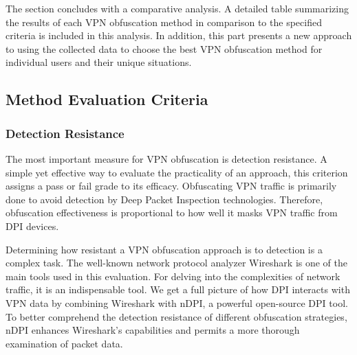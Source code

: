 \documentclass[12pt, fleqn, a4paper]{article}
\begin{document}
The section concludes with a comparative analysis. A detailed table summarizing the results of each VPN obfuscation method in comparison to the specified criteria is included in this analysis. In addition, this part presents a new approach to using the collected data to choose the best VPN obfuscation method for individual users and their unique situations.

\subsection{Method Evaluation Criteria}
\subsubsection{Detection Resistance}
The most important measure for VPN obfuscation is detection resistance. A simple yet effective way to evaluate the practicality of an approach, this criterion assigns a pass or fail grade to its efficacy. Obfuscating VPN traffic is primarily done to avoid detection by Deep Packet Inspection technologies. Therefore, obfuscation effectiveness is proportional to how well it masks VPN traffic from DPI devices.

Determining how resistant a VPN obfuscation approach is to detection is a complex task. The well-known network protocol analyzer Wireshark is one of the main tools used in this evaluation. For delving into the complexities of network traffic, it is an indispensable tool. We get a full picture of how DPI interacts with VPN data by combining Wireshark with nDPI, a powerful open-source DPI tool. To better comprehend the detection resistance of different obfuscation strategies, nDPI enhances Wireshark's capabilities and permits a more thorough examination of packet data.
\end{document}
